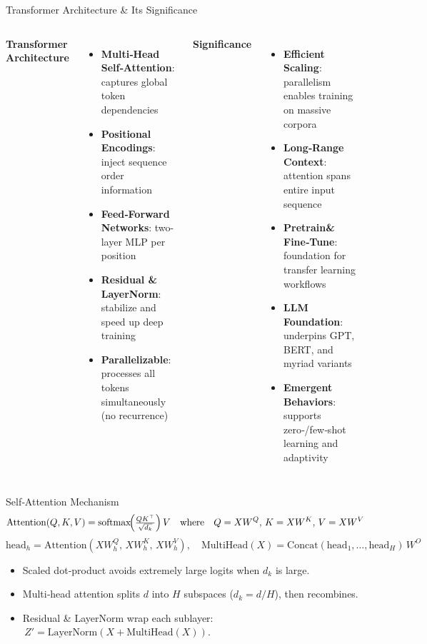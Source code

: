 \documentclass[german,10pt]{beamer}
\begin{document}
\begin{frame}{Transformer Architecture \& Its Significance}
  \begin{columns}[t]
      \textbf{Transformer Architecture}
      \begin{itemize}
        \item \textbf{Multi‑Head Self‑Attention}: captures global token dependencies
        \item \textbf{Positional Encodings}: inject sequence order information
        \item \textbf{Feed‑Forward Networks}: two-layer MLP per position
        \item \textbf{Residual \& LayerNorm}: stabilize and speed up deep training
        \item \textbf{Parallelizable}: processes all tokens simultaneously (no recurrence)
      \end{itemize}

      \textbf{Significance}
      \begin{itemize}
        \item \textbf{Efficient Scaling}: parallelism enables training on massive corpora
        \item \textbf{Long‑Range Context}: attention spans entire input sequence
        \item \textbf{Pretrain\& Fine‑Tune}: foundation for transfer learning workflows
        \item \textbf{LLM Foundation}: underpins GPT, BERT, and myriad variants
        \item \textbf{Emergent Behaviors}: supports zero‑/few‑shot learning and adaptivity
      \end{itemize}
  \end{columns}
\end{frame}

\begin{frame}{Self‑Attention Mechanism}
  {\small
  \[
    \mathrm{Attention}(Q,K,V)
    = \mathrm{softmax}\!\Bigl(\tfrac{QK^\top}{\sqrt{d_k}}\Bigr)\,V
    \quad\text{where}\quad
    Q = XW^Q,\,
    K = XW^K,\,
    V = XW^V
  \]
  \[
    \text{head}_h = \mathrm{Attention}(XW_h^Q,\,XW_h^K,\,XW_h^V),\quad
    \mathrm{MultiHead}(X) = \mathrm{Concat}(\text{head}_1,\dots,\text{head}_H)\,W^O
  \]
  }
  \vspace{-0.5em}
  \begin{itemize}
    \item Scaled dot‑product avoids extremely large logits when $d_k$ is large.
    \item Multi‑head attention splits $d$ into $H$ subspaces ($d_k = d/H$), then recombines.
    \item Residual \& LayerNorm wrap each sublayer:
      \(\,Z' = \mathrm{LayerNorm}(X + \mathrm{MultiHead}(X))\).
  \end{itemize}
\end{frame}
\end{document}
